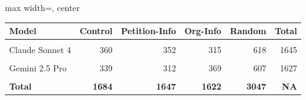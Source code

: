 \renewcommand{\arraystretch}{1.2}
\begin{adjustbox}{max width=\linewidth, center}
\begingroup\fontsize{10}{12}\selectfont

\begin{tabular}{lrrrrr}
\toprule
\textbf{Model} & \textbf{Control} & \textbf{Petition-Info} & \textbf{Org-Info} & \textbf{Random} & \textbf{Total}\\
\midrule
\cellcolor{gray!15}{ChatGPT-4o} & \cellcolor{gray!15}{325} & \cellcolor{gray!15}{337} & \cellcolor{gray!15}{311} & \cellcolor{gray!15}{591} & \cellcolor{gray!15}{1564}\\
Claude Sonnet 4 & 360 & 352 & 315 & 618 & 1645\\
\cellcolor{gray!15}{GPT-4.1} & \cellcolor{gray!15}{340} & \cellcolor{gray!15}{334} & \cellcolor{gray!15}{324} & \cellcolor{gray!15}{622} & \cellcolor{gray!15}{1620}\\
Gemini 2.5 Pro & 339 & 312 & 369 & 607 & 1627\\
\cellcolor{gray!15}{Grok 4} & \cellcolor{gray!15}{320} & \cellcolor{gray!15}{312} & \cellcolor{gray!15}{303} & \cellcolor{gray!15}{609} & \cellcolor{gray!15}{1544}\\
\textbf{Total} & \textbf{1684} & \textbf{1647} & \textbf{1622} & \textbf{3047} & \textbf{NA}\\
\bottomrule
\end{tabular}
\endgroup{}

\end{adjustbox}

